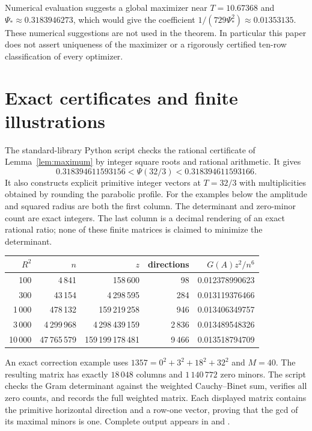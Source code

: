 \documentclass[11pt]{article}
\theoremstyle{remark}\newtheorem{remark}[theorem]{Remark}
\begin{document}
Numerical evaluation suggests a global maximizer near $T=10.67368$ and $\Psi_*\approx0.3183946273$, which would give the coefficient $1/(729\Psi_*^2)\approx0.01353135$. These numerical suggestions are not used in the theorem. In particular this paper does not assert uniqueness of the maximizer or a rigorously certified ten-row classification of every optimizer.

\section{Exact certificates and finite illustrations}
The standard-library Python script  checks the rational certificate of Lemma~\ref{lem:maximum} by integer square roots and rational arithmetic. It gives
\[
 0.318394611593156<\Psi(32/3)<0.318394611593166.
\]
It also constructs explicit primitive integer vectors at $T=32/3$ with multiplicities obtained by rounding the parabolic profile. For the examples below the amplitude and squared radius are both the first column. The determinant and zero-minor count are exact integers. The last column is a decimal rendering of an exact rational ratio; none of these finite matrices is claimed to minimize the determinant.
\begin{center}\small
\begin{tabular}{rrrrr}\toprule
$R^2$ & $n$ & $z$ & directions & $G(A)z^2/n^6$\\\midrule
100 & 4\,841 & 158\,600 & 98 & 0.012378990623\\
300 & 43\,154 & 4\,298\,595 & 284 & 0.013119376466\\
1\,000 & 478\,132 & 159\,219\,258 & 946 & 0.013406349757\\
3\,000 & 4\,299\,968 & 4\,298\,439\,159 & 2\,836 & 0.013489548326\\
10\,000 & 47\,765\,579 & 159\,199\,178\,481 & 9\,466 & 0.013518794709\\\bottomrule
\end{tabular}
\end{center}
An exact correction example uses $1357=0^2+3^2+18^2+32^2$ and $M=40$. The resulting matrix has exactly $18\,048$ columns and $1\,140\,772$ zero minors. The script checks the Gram determinant against the weighted Cauchy--Binet sum, verifies all zero counts, and records the full weighted matrix. Each displayed matrix contains the primitive horizontal direction and a row-one vector, proving that the gcd of its maximal minors is one. Complete output appears in  and .
\end{document}
